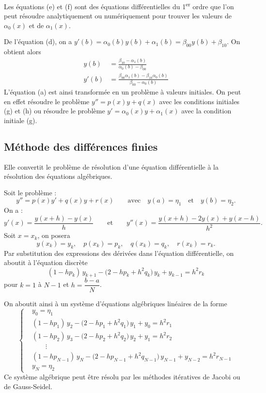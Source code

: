 Les équations (e) et (f) sont des équations différentielles du
1\textsuperscript{er} ordre que l'on peut résoudre analytiquement ou
numériquement pour trouver les valeurs de $\alpha_0(x)$ et de $\alpha_1(x)$.

De l'équation (d), on a
$y'(b) = \alpha_0(b)y(b) + \alpha_1(b) = \beta_{00}y(b) + \beta_{10}$. On
obtient alors
\begin{align}
  y(b) &= \frac{\beta_{10} - \alpha_1(b)}{\alpha_0(b) - \beta_{00}} \tag{g}\\
  y'(b) &= \frac{\beta_{00}\alpha_1(b) - \beta_{10}\alpha_0(b)}{\beta_{00} - \alpha_0(b)} \tag{h}
\end{align}
L'équation (a) est ainsi transformée en un problème à valeurs initiales. On
peut en effet résoudre le problème $y'' = p(x)y + q(x)$ avec les conditions
initiales (g) et (h) ou résoudre le problème $y' = \alpha_0(x)y + \alpha_1(x)$
avec la condition initiale (g).

\subsection{Méthode des différences finies}

Elle convertit le problème de résolution d'une équation différentielle à la
résolution des équations algébriques.

Soit le problème :
\[
  y'' = p(x)y' + q(x)y + r(x) \qquad\text{avec}\quad y(a) = \eta_1 \quad\text{et}\quad y(b) = \eta_2 .
\]
On a :
\[
  y'(x) = \frac{y(x+h) - y(x)}{h}
  \qquad\text{et}\qquad
  y''(x) = \frac{y(x+h) - 2y(x) + y(x-h)}{h^2} .
\]
Soit $x = x_k$, on posera
\[
  y(x_k) = y_k, \quad p(x_k) = p_k, \quad q(x_k) = q_k, \quad r(x_k) = r_k .
\]
Par substitution des expressions des dérivées dans l'équation différentielle,
on aboutit à l'équation discrète
\[
  (1 - hp_k)\,y_{k+1} - \bigl(2 - hp_k + h^2q_k\bigr)\,y_k + y_{k-1} = h^2r_k
\]
pour $k = 1$ à $N-1$ et $h = \dfrac{b - a}{N}$.

On aboutit ainsi à un système d'équations algébriques linéaires de la forme
\[
  \left\{
  \begin{aligned}
    &y_0 = \eta_1\\
    &(1 - hp_1)\,y_2 - \bigl(2 - hp_1 + h^2q_1\bigr)\,y_1 + y_0 = h^2r_1\\
    &(1 - hp_2)\,y_3 - \bigl(2 - hp_2 + h^2q_2\bigr)\,y_2 + y_1 = h^2r_2\\
    &\qquad\vdots\\
    &(1 - hp_{N-1})\,y_N - \bigl(2 - hp_{N-1} + h^2q_{N-1}\bigr)\,y_{N-1} + y_{N-2} = h^2r_{N-1}\\
    &y_N = \eta_2
  \end{aligned}
  \right.
\]
Ce système algébrique peut être résolu par les méthodes itératives de Jacobi
ou de Gauss-Seidel.

